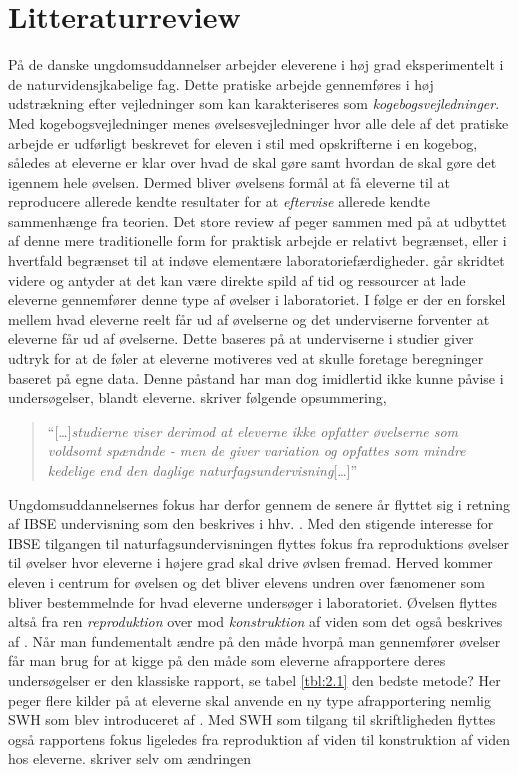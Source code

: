 \section{Litteraturreview}
\label{sec:rev}

På de danske ungdomsuddannelser arbejder eleverene i høj grad eksperimentelt i de naturvidensjkabelige fag. Dette pratiske arbejde gennemføres i høj udstrækning efter vejledninger som kan karakteriseres som \emph{kogebogsvejledninger}. Med kogebogsvejledninger menes øvelsesvejledninger hvor alle dele af det pratiske arbejde er udførligt beskrevet for eleven i stil med opskrifterne i en kogebog, således at eleverne er klar over hvad de skal gøre samt hvordan de skal gøre det igennem hele øvelsen. Dermed bliver øvelsens formål at få eleverne til at reproducere allerede kendte resultater for at \emph{eftervise} allerede kendte sammenhænge fra teorien. Det store review af \citep{Miller2018} peger sammen med \citep{Hodson2008} på at udbyttet af denne mere traditionelle form for praktisk arbejde er relativt begrænset, eller i hvertfald begrænset til at indøve elementære laboratoriefærdigheder. \citep{Hodson2008} går skridtet videre og antyder at det kan være direkte spild af tid og ressourcer at lade eleverne gennemfører denne type af øvelser i laboratoriet.  I følge \citep{Hodson2008} er der en forskel mellem hvad eleverne reelt får ud af øvelserne  og det underviserne forventer at eleverne får ud af øvelserne. Dette baseres på at underviserne i studier giver udtryk for at de føler at eleverne motiveres ved at skulle foretage beregninger baseret på egne data. Denne påstand har man dog imidlertid ikke kunne påvise i undersøgelser, blandt eleverne. \citet{Krogh2016} skriver følgende opsummering,
\begin{quote}
``[\ldots]\emph{studierne viser derimod at eleverne ikke opfatter øvelserne som voldsomt spændnde - men de giver variation og opfattes som mindre kedelige end den daglige naturfagsundervisning}[\ldots]''
\end{quote}
Ungdomsuddannelsernes fokus har derfor gennem de senere år flyttet sig i retning af IBSE undervisning som den beskrives i hhv. \citep{Dolin2014, Krogh2016}. Med den stigende interesse for IBSE tilgangen til naturfagsundervisningen flyttes fokus fra reproduktions øvelser til øvelser hvor eleverne i højere grad skal drive øvlsen fremad. Herved kommer eleven i centrum for øvelsen og det bliver elevens undren over fænomener som bliver bestemmelnde for hvad eleverne undersøger i laboratoriet. Øvelsen flyttes altså fra ren \emph{reproduktion} over mod \emph{konstruktion} af viden som det også beskrives af \citep{Krogh2016}. Når man fundementalt ændre på den måde hvorpå man gennemfører øvelser får man brug for at kigge på den måde som eleverne afrapportere deres undersøgelser er den klassiske rapport, se tabel \vref{tbl:2.1} den bedste metode?  Her peger flere kilder \citep[m.fl.]{Burke2005, Erkol2010} på at eleverne skal anvende en ny type afrapportering nemlig SWH som blev introduceret af \citep{Keys1999}. Med SWH som tilgang til skriftligheden flyttes også rapportens fokus ligeledes fra reproduktion af viden til konstruktion af viden hos eleverne. \citet{Keys1999} skriver selv om ændringen 
